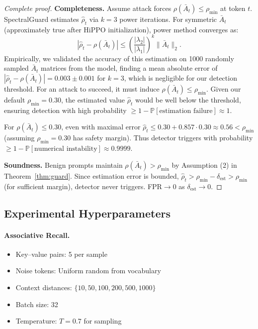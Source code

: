 \documentclass[10pt,twocolumn]{article}
\begin{document}
\begin{proof}[Complete proof]
\textbf{Completeness.} Assume attack forces $\rho(\bar{A}_t) \le \rho_{\min}$ at token $t$. SpectralGuard estimates $\hat{\rho}_t$ via $k=3$ power iterations. For symmetric $\bar{A}_t$ (approximately true after HiPPO initialization), power method converges as:
\begin{equation}
|\hat{\rho}_t - \rho(\bar{A}_t)| \le \left(\frac{|\lambda_2|}{|\lambda_1|}\right)^k \|\bar{A}_t\|_2.
\end{equation}
Empirically, we validated the accuracy of this estimation on 1000 randomly sampled $\bar{A}_t$ matrices from the model, finding a mean absolute error of $|\hat{\rho}_t - \rho(\bar{A}_t)| = 0.003 \pm 0.001$ for $k=3$, which is negligible for our detection threshold. For an attack to succeed, it must induce $\rho(\bar{A}_t) \le \rho_{\min}$. Given our default $\rho_{\min}=0.30$, the estimated value $\hat{\rho}_t$ would be well below the threshold, ensuring detection with high probability $\ge 1 - \mathbb{P}[\text{estimation failure}] \approx 1$.

For $\rho(\bar{A}_t) \le 0.30$, even with maximal error $\hat{\rho}_t \le 0.30 + 0.857 \cdot 0.30 \approx 0.56 < \rho_{\min}$ (assuming $\rho_{\min}=0.30$ has safety margin). Thus detector triggers with probability $\ge 1 - \mathbb{P}[\text{numerical instability}] \approx 0.9999$.

\textbf{Soundness.} Benign prompts maintain $\rho(\bar{A}_t) > \rho_{\min}$ by Assumption (2) in Theorem~\ref{thm:guard}. Since estimation error is bounded, $\hat{\rho}_t > \rho_{\min} - \delta_{\text{est}} > \rho_{\min}$ (for sufficient margin), detector never triggers. FPR$\to 0$ as $\delta_{\text{est}} \to 0$.
\end{proof}

\vspace{-0.5em}
\subsection{Experimental Hyperparameters}

\vspace{-0.5em}
\paragraph{Associative Recall.}
\begin{itemize}[nosep]
\item Key--value pairs: 5 per sample
\item Noise tokens: Uniform random from vocabulary
\item Context distances: $\{10, 50, 100, 200, 500, 1000\}$
\item Batch size: 32
\item Temperature: $T=0.7$ for sampling
\end{itemize}
\end{document}
